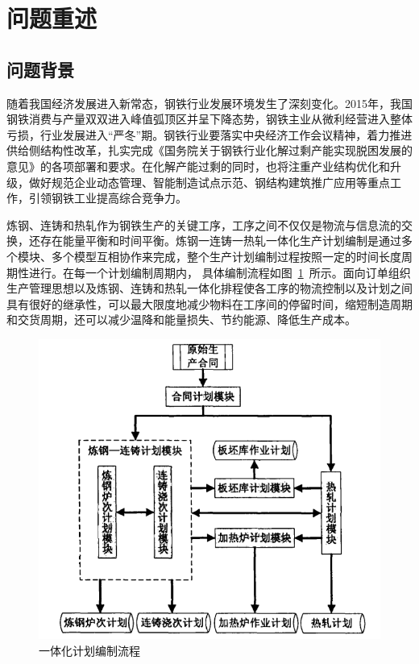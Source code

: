 \documentclass{whutmod}
\begin{document}
	\thispagestyle{empty}
	\tableofcontents
	\setcounter{page}{0}                                      
	\newpage	%
	

	
	\section{问题重述}	
		\subsection{问题背景}
	    随着我国经济发展进入新常态，钢铁行业发展环境发生了深刻变化。2015年，我国钢铁消费与产量双双进入峰值弧顶区并呈下降态势，钢铁主业从微利经营进入整体亏损，行业发展进入“严冬”期。钢铁行业要落实中央经济工作会议精神，着力推进供给侧结构性改革，扎实完成《国务院关于钢铁行业化解过剩产能实现脱困发展的意见》的各项部署和要求。在化解产能过剩的同时，也将注重产业结构优化和升级，做好规范企业动态管理、智能制造试点示范、钢结构建筑推广应用等重点工作，引领钢铁工业提高综合竞争力。
	    
	    炼钢、连铸和热轧作为钢铁生产的关键工序，工序之间不仅仅是物流与信息流的交换，还存在能量平衡和时间平衡。炼钢一连铸一热轧一体化生产计划编制是通过多个模块、多个模型互相协作来完成，整个生产计划编制过程按照一定的时间长度周期性进行。在每一个计划编制周期内， 具体编制流程如图~\ref{111111}~所示。面向订单组织生产管理思想以及炼钢、连铸和热轧一体化排程使各工序的物流控制以及计划之间具有很好的继承性，可以最大限度地减少物料在工序间的停留时间，缩短制造周期和交货周期，还可以减少温降和能量损失、节约能源、降低生产成本。
				\begin{figure}[H]
		\centering
		\includegraphics[width=.8\textwidth]{figures/asd.png}
		\caption{一体化计划编制流程}\label{111111}
	\end{figure}
\end{document}
